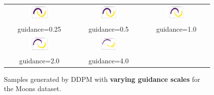 \documentclass[11pt]{article}
\begin{document}
\begin{figure}[H]
    \centering
    \begin{tabular}{ccc}
        \includegraphics[width=0.3\textwidth]{exps/ddpm_2_150_0.0001_0.02_moons/samples_cfg_150_0.25.png} &
        \includegraphics[width=0.3\textwidth]{exps/ddpm_2_150_0.0001_0.02_moons/samples_cfg_150_0.5.png} &
        \includegraphics[width=0.3\textwidth]{exps/ddpm_2_150_0.0001_0.02_moons/samples_cfg_150_1.0.png} \\
        guidance=0.25 & guidance=0.5 & guidance=1.0 \\ [0.5em]

        \includegraphics[width=0.3\textwidth]{exps/ddpm_2_150_0.0001_0.02_moons/samples_cfg_150_2.0.png} &
        \includegraphics[width=0.3\textwidth]{exps/ddpm_2_150_0.0001_0.02_moons/samples_cfg_150_4.0.png} & \\
        guidance=2.0 & guidance=4.0 & \\
    \end{tabular}
    \caption{Samples generated by DDPM with \textbf{varying guidance scales} for the Moons dataset.}
    \label{fig:guidance_moons}
\end{figure}
\end{document}
